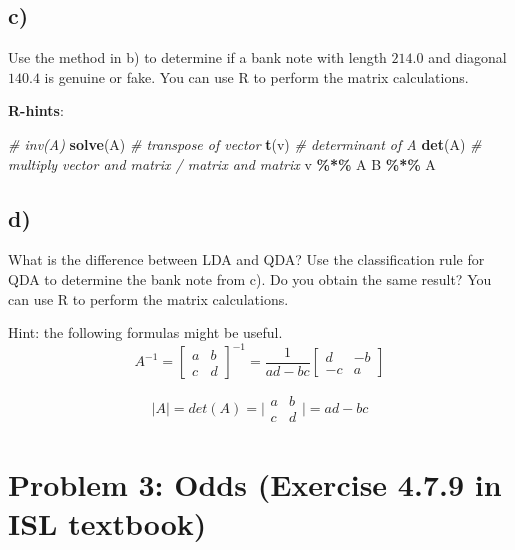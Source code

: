 \documentclass[
]{article}
\newenvironment{Shaded}{\begin{snugshade}}{\end{snugshade}}
\newcommand{\CommentTok}[1]{\textcolor[rgb]{0.56,0.35,0.01}{\textit{#1}}}
\newcommand{\FunctionTok}[1]{\textcolor[rgb]{0.13,0.29,0.53}{\textbf{#1}}}
\newcommand{\NormalTok}[1]{#1}
\newcommand{\SpecialCharTok}[1]{\textcolor[rgb]{0.81,0.36,0.00}{\textbf{#1}}}
\begin{document}
\hypertarget{c-1}{%
\subsection{c)}\label{c-1}}

Use the method in b) to determine if a bank note with length \(214.0\)
and diagonal \(140.4\) is genuine or fake. You can use R to perform the
matrix calculations.

\textbf{R-hints}:

\begin{Shaded}
\begin{Highlighting}[]
\CommentTok{\# inv(A)}
\FunctionTok{solve}\NormalTok{(A)}
\CommentTok{\# transpose of vector}
\FunctionTok{t}\NormalTok{(v)}
\CommentTok{\# determinant of A}
\FunctionTok{det}\NormalTok{(A)}
\CommentTok{\# multiply vector and matrix / matrix and matrix}
\NormalTok{v }\SpecialCharTok{\%*\%}\NormalTok{ A}
\NormalTok{B }\SpecialCharTok{\%*\%}\NormalTok{ A}
\end{Highlighting}
\end{Shaded}

\hypertarget{d}{%
\subsection{d)}\label{d}}

What is the difference between LDA and QDA? Use the classification rule
for QDA to determine the bank note from c). Do you obtain the same
result? You can use R to perform the matrix calculations.

Hint: the following formulas might be useful. \[A^{-1} = \left[
\begin{array}{cc} a & b \\ c & d \end{array} 
\right]^{-1} = \frac{1}{ad-bc}
\left[
\begin{array}{cc} d & -b \\ -c & a \end{array} 
\right]\]

\[ |A| = det(A) = \Big|\begin{array}{cc} a & b \\ c & d \end{array}\Big| = ad - bc \]

\hypertarget{problem-3-odds-exercise-4.7.9-in-isl-textbook}{%
\section{Problem 3: Odds (Exercise 4.7.9 in ISL
textbook)}\label{problem-3-odds-exercise-4.7.9-in-isl-textbook}}
\end{document}
